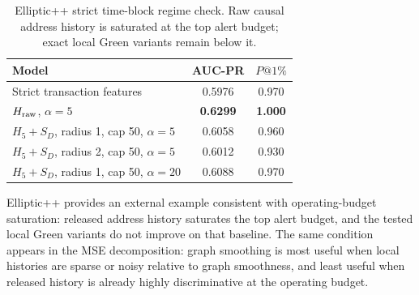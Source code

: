\documentclass[11pt]{article}
\theoremstyle{definition}
\theoremstyle{remark}
\begin{document}
\begin{table}[h]
\centering
\caption{Elliptic++ strict time-block regime check. Raw causal address history is saturated at the top alert budget; exact local Green variants remain below it.}
\label{tab:ellipticpp-smoke}
\begin{tabular}{lcc}
\toprule
Model & AUC-PR & $P@1\%$ \\
\midrule
Strict transaction features & 0.5976 & 0.970 \\
$H_{\rm raw}$, $\alpha=5$ & \textbf{0.6299} & \textbf{1.000} \\
$H_5+S_D$, radius 1, cap 50, $\alpha=5$ & 0.6058 & 0.960 \\
$H_5+S_D$, radius 2, cap 50, $\alpha=5$ & 0.6012 & 0.930 \\
$H_5+S_D$, radius 1, cap 50, $\alpha=20$ & 0.6088 & 0.970 \\
\bottomrule
\end{tabular}
\end{table}

Elliptic++ provides an external example consistent with operating-budget saturation: released address history saturates the top alert budget, and the tested local Green variants do not improve on that baseline. The same condition appears in the MSE decomposition: graph smoothing is most useful when local histories are sparse or noisy relative to graph smoothness, and least useful when released history is already highly discriminative at the operating budget.
\end{document}
